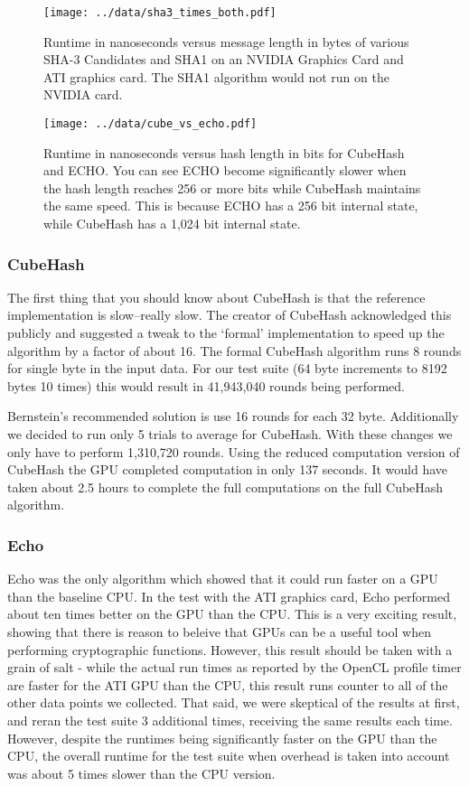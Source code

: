 \begin{figure}[h!tp]
\texttt{[image: ../data/sha3\_times\_both.pdf]}
\caption{Runtime in nanoseconds versus message length in bytes of various SHA-3 Candidates and SHA1 on an NVIDIA Graphics Card and ATI graphics card. The SHA1 algorithm would not run on the NVIDIA card.}\label{fig:sha3_times_both}
\end{figure}

\begin{figure}[h!tp]
\texttt{[image: ../data/cube\_vs\_echo.pdf]}
\caption{Runtime in nanoseconds versus hash length in bits for CubeHash and ECHO.  You can see ECHO become significantly slower when the hash length reaches 256 or more bits while CubeHash maintains the same speed.  This is because ECHO has a 256 bit internal state, while CubeHash has a 1,024 bit internal state.}\label{fig:cube_vs_echo}
\end{figure}
\newpage
\subsubsection*{CubeHash}
The first thing that you should know about CubeHash is that the reference implementation is  slow--really slow.
The creator of CubeHash acknowledged this publicly\cite{Bernstein} and suggested a tweak to the `formal' implementation to speed up the algorithm by a factor of about 16.
The formal CubeHash algorithm runs 8 rounds for single byte in the input data. For our test suite (64 byte increments to 8192 bytes 10 times) this would result in 41,943,040 rounds being performed.

Bernstein's recommended solution is use 16 rounds for each 32 byte.
Additionally we decided to run only 5 trials to average for CubeHash.
With these changes we only have to perform 1,310,720 rounds.
Using the reduced computation version of CubeHash the GPU completed computation in only 137 seconds.
It would have taken about 2.5 hours to complete the full computations on the full CubeHash algorithm.

\subsubsection*{Echo}
Echo was the only algorithm which showed that it could run faster on a GPU than the baseline CPU.  In the test with the ATI graphics card, Echo performed about ten times better on the GPU than the CPU.
This is a very exciting result, showing that there is reason to beleive that GPUs can be a useful tool when performing cryptographic functions.
However, this result should be taken with a grain of salt - while the actual run times as reported by the OpenCL profile timer are faster for the ATI GPU than the CPU, this result runs counter to all of the other data points we collected.
That said, we were skeptical of the results at first, and reran the test suite 3 additional times, receiving the same results each time.
However, despite the runtimes being significantly faster on the GPU than the CPU, the overall runtime for the test suite when overhead is taken into account was about 5 times slower than the CPU version.

